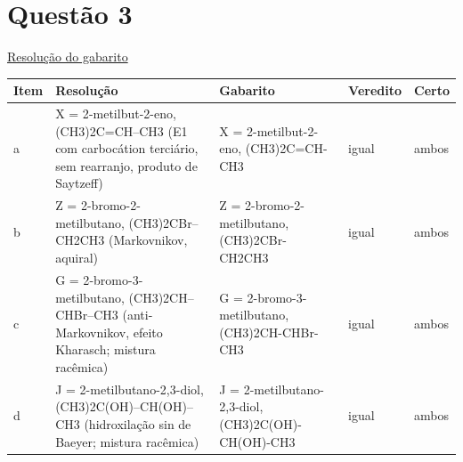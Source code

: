 \documentclass{article}%
\begin{document}
\section*{Questão 3}%
\href{https://poliedroresolve.sistemapoliedro.com.br/vestibulares/ita/2027/ita-2-fase-dia-2-21-10-2026-2-fase-dia-2/dissertativa-3-quimica-2-fase-dia-2-ita-2027}{Resolução do gabarito}\par\smallskip%
\begin{longtable}{@{}p{} p{} p{} p{} p{}@{}}\toprule Item & Resolução & Gabarito & Veredito & Certo \\ \midrule
a & X = 2{-}metilbut{-}2{-}eno, (CH3)2C=CH--CH3 (E1 com carbocátion terciário, sem rearranjo, produto de Saytzeff) & X = 2{-}metilbut{-}2{-}eno, (CH3)2C=CH-CH3 & igual & ambos \\
b & Z = 2{-}bromo{-}2{-}metilbutano, (CH3)2CBr--CH2CH3 (Markovnikov, aquiral) & Z = 2{-}bromo{-}2{-}metilbutano, (CH3)2CBr-CH2CH3 & igual & ambos \\
c & G = 2{-}bromo{-}3{-}metilbutano, (CH3)2CH--CHBr--CH3 (anti{-}Markovnikov, efeito Kharasch; mistura racêmica) & G = 2{-}bromo{-}3{-}metilbutano, (CH3)2CH-CHBr-CH3 & igual & ambos \\
d & J = 2{-}metilbutano{-}2,3{-}diol, (CH3)2C(OH)--CH(OH)--CH3 (hidroxilação sin de Baeyer; mistura racêmica) & J = 2{-}metilbutano{-}2,3{-}diol, (CH3)2C(OH)-CH(OH)-CH3 & igual & ambos \\
\bottomrule\end{longtable}%
\end{document}
